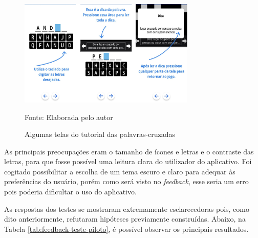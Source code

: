 \begin{figure}[H]
\centering
    \caption{Algumas telas do tutorial das palavras-cruzadas}
    \label{fig:tutorial}
    \includegraphics[width=0.75\textwidth]{Figuras/tutorial.jpg}
    
    Fonte: Elaborada pelo autor
\end{figure}

As principais preocupações eram o tamanho de ícones e letras e o contraste das letras, para que fosse possível uma leitura clara do utilizador do aplicativo. Foi cogitado possibilitar a escolha de um tema escuro e claro para adequar às preferências do usuário, porém como será visto no \textit{feedback}, esse seria um erro pois poderia dificultar o uso do aplicativo.

As respostas dos testes se mostraram extremamente esclarecedoras pois, como dito anteriormente, refutaram hipóteses previamente construídas. Abaixo, na Tabela \ref{tab:feedback-teste-piloto}, é possível observar os principais resultados.

